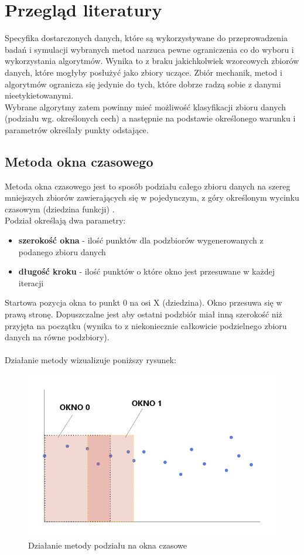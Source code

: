 \documentclass[eng,printmode]{mgr}
\begin{document}
\chapter{Przegląd literatury}
Specyfika dostarczonych danych, które są wykorzystywane do przeprowadzenia badań i symulacji wybranych metod narzuca pewne ograniczenia co do wyboru i wykorzystania algorytmów. Wynika to z braku jakichkolwiek wzorcowych zbiorów danych, które mogłyby posłużyć jako zbiory uczące. Zbiór mechanik, metod i algorytmów ogranicza się jedynie do tych, które dobrze radzą sobie z danymi nieetykietowanymi. \\
Wybrane algorytmy zatem powinny mieć możliwość klasyfikacji zbioru danych (podziału wg. określonych cech) a następnie na podstawie określonego warunku i parametrów określały punkty odstające.

\section{Metoda okna czasowego}
Metoda okna czasowego jest to sposób podziału całego zbioru danych na szereg mniejszych zbiorów zawierających się w pojedynczym, z góry określonym wycinku czasowym (dziedzina funkcji) \cite{windowing}.\\
Podział określają dwa parametry:
\begin{itemize}
\item \textbf{szerokość okna} - ilość punktów dla podzbiorów wygenerowanych z podanego zbioru danych
\item \textbf{długość kroku} - ilość punktów o które okno jest przesuwane w każdej iteracji
\end{itemize}

Startowa pozycja okna to punkt 0 na osi X (dziedzina). Okno przesuwa się w prawą stronę. Dopuszczalne jest aby ostatni podzbiór miał inną szerokość niż przyjęta na początku (wynika to z niekoniecznie całkowicie podzielnego zbioru danych na równe podzbiory).
\\ \\
Działanie metody wizualizuje poniższy rysunek:

\begin{figure}[H]
  \begin{center}
  \includegraphics[scale=0.7]{okno_czasowe}
  \end{center}
  \caption{Działanie metody podziału na okna czasowe}
\end{figure}
\end{document}
